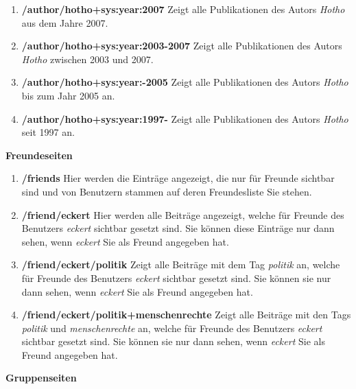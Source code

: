 \begin{enumerate}
    \item \textbf{/author/hotho+sys:year:2007} \newline
    Zeigt alle Publikationen des Autors \textit{Hotho} aus dem Jahre 2007.
    \item \textbf{/author/hotho+sys:year:2003-2007} \newline
    Zeigt alle Publikationen des Autors \textit{Hotho} zwischen 2003 und 2007.
    \item \textbf{/author/hotho+sys:year:-2005} \newline
    Zeigt alle Publikationen des Autors \textit{Hotho} bis zum Jahr 2005 an.
    \item \textbf{/author/hotho+sys:year:1997-} \newline
    Zeigt alle Publikationen des Autors \textit{Hotho} seit 1997 an.
\end{enumerate}
\textbf{Freundeseiten} 
\begin{enumerate}
    \item \textbf{/friends} \newline
    Hier werden die Einträge angezeigt, die nur für Freunde sichtbar sind und von Benutzern stammen auf deren Freundesliste Sie stehen.
    \item \textbf{/friend/eckert} \newline
    Hier werden alle Beiträge angezeigt, welche für Freunde des Benutzers \textit{eckert} sichtbar gesetzt sind. Sie können diese Einträge nur dann sehen, wenn \textit{eckert} Sie als Freund angegeben hat.
    \item \textbf{/friend/eckert/politik} \newline
    Zeigt alle Beiträge mit dem Tag \textit{politik} an, welche für Freunde des Benutzers \textit{eckert} sichtbar gesetzt sind. Sie können sie nur dann sehen, wenn \textit{eckert} Sie als Freund angegeben hat.
    \item \textbf{/friend/eckert/politik+menschenrechte} \newline
    Zeigt alle Beiträge mit den Tags \textit{politik} und \textit{menschenrechte} an, welche für Freunde des Benutzers \textit{eckert} sichtbar gesetzt sind. Sie können sie nur dann sehen, wenn \textit{eckert} Sie als Freund angegeben hat.
\end{enumerate}
\textbf{Gruppenseiten}

